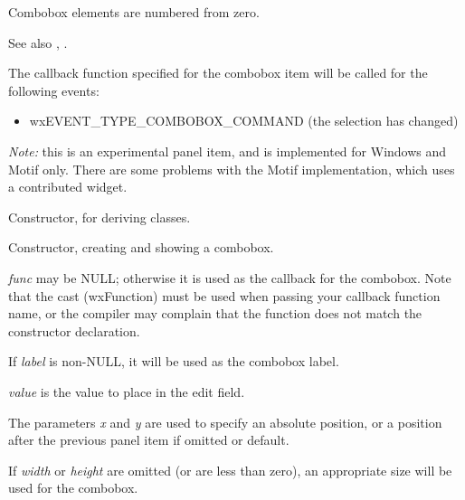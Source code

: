 Combobox elements are numbered from zero.

See also , .

The callback function specified for the combobox item will be called
for the following events:

\begin{itemize}\itemsep=0pt
\item wxEVENT\_TYPE\_COMBOBOX\_COMMAND (the selection has changed)
\end{itemize}

{\it Note:} this is an experimental panel item, and is implemented for Windows and Motif only. There
are some problems with the Motif implementation, which uses a contributed widget.

\label{constrcombobox}


Constructor, for deriving classes.


Constructor, creating and showing a combobox.

{\it func} may be NULL; otherwise it is used as the callback for the
combobox.  Note that the cast (wxFunction) must be used when passing
your callback function name, or the compiler may complain that the
function does not match the constructor declaration.

If {\it label} is non-NULL, it will be used as the combobox label.

{\it value} is the value to place in the edit field.

The parameters {\it x} and {\it y} are used to specify an absolute
position, or a position after the previous panel item if omitted or
default.

If {\it width} or {\it height} are omitted (or are less than zero), an
appropriate size will be used for the combobox.

